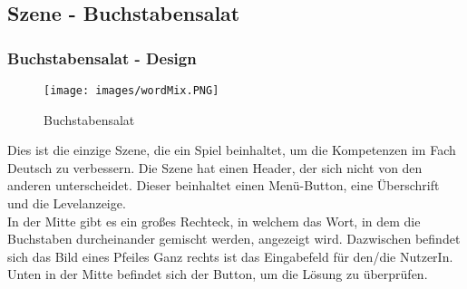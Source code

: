 \subsection{Szene - Buchstabensalat}
\subsubsection{Buchstabensalat - Design}
\begin{figure}[htbp]
  \centering
  \texttt{[image: images/wordMix.PNG]}
  \caption{Buchstabensalat}
  \label{wordMix}
\end{figure}
Dies ist die einzige Szene, die ein Spiel beinhaltet, um die Kompetenzen im Fach Deutsch zu verbessern. Die Szene hat einen Header, der sich nicht von den anderen unterscheidet. Dieser beinhaltet einen Menü-Button, eine Überschrift und die Levelanzeige.\\
In der Mitte gibt es ein großes Rechteck, in welchem das Wort, in dem die Buchstaben durcheinander gemischt werden, angezeigt wird. Dazwischen befindet sich das Bild eines Pfeiles\autocite{Pfeil}
Ganz rechts ist das Eingabefeld für den/die NutzerIn. Unten in der Mitte befindet sich der Button, um die Lösung zu überprüfen.
